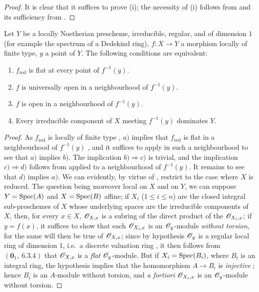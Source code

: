 \begin{proof}
It is clear that it suffices to prove (i); the necessity of (i) follows from  and its sufficiency from .
\end{proof}

\begin{proposition}[14.3.8]
\label{IV.14.3.8}
Let $Y$ be a locally Noetherian prescheme, irreducible, regular, and of dimension $1$ (for example the spectrum of a Dedekind ring), $f:X\to Y$ a morphism locally of finite type, $y$ a point of $Y$.
The following conditions are equivalent:
\begin{enumerate}[label=\emph{\alph*)}]
  \item $f_{\mathrm{red}}$ is flat at every point of $f^{-1}(y)$.
  \item $f$ is universally open in a neighbourhood of $f^{-1}(y)$.
  \item $f$ is open in a neighbourhood of $f^{-1}(y)$.
  \item Every irreducible component of $X$ meeting $f^{-1}(y)$ dominates $Y$.
\end{enumerate}
\end{proposition}

\begin{proof}
As $f_{\mathrm{red}}$ is locally of finite type , $a)$ implies that $f_{\mathrm{red}}$ is flat in a neighbourhood of $f^{-1}(y)$ , and it suffices to apply  in such a neighbourhood to see that $a)$ implies $b)$.
The implication $b)\Rightarrow c)$ is trivial, and the implication $c)\Rightarrow d)$ follows from  applied to a neighbourhood of $f^{-1}(y)$.
It remains to see that $d)$ implies $a)$.
We can evidently, by virtue of , restrict to the case where $X$ is reduced.
The question being moreover local on $X$ and on $Y$, we can suppose $Y=\operatorname{Spec}(A)$ and $X=\operatorname{Spec}(B)$
affine; if $X_i$ ($1\leq i\leq n$) are the closed integral sub-preschemes of $X$ whose underlying spaces are the irreducible components of $X$, then, for every $x\in X$, $\mathscr{O}_{X,x}$ is a subring of the direct product of the $\mathscr{O}_{X_i,x}$; if $y=f(x)$, it suffices to show that each $\mathscr{O}_{X_i,x}$ is an $\mathscr{O}_y$-module \emph{without torsion}, for the same will then be true of $\mathscr{O}_{X,x}$; since by hypothesis $\mathscr{O}_y$ is a regular local ring of dimension $1$, i.e.\ a discrete valuation ring , it then follows from $(\mathbf{0}_1,~6.3.4)$ that $\mathscr{O}_{X,x}$ is a \emph{flat} $\mathscr{O}_y$-module.
But if $X_i=\operatorname{Spec}(B_i)$, where $B_i$ is an integral ring, the hypothesis implies that the homomorphism $A\to B_i$ is \emph{injective} ; hence $B_i$ is an $A$-module without torsion, and \emph{a fortiori} $\mathscr{O}_{X_i,x}$ is an $\mathscr{O}_y$-module without torsion.
\end{proof}

